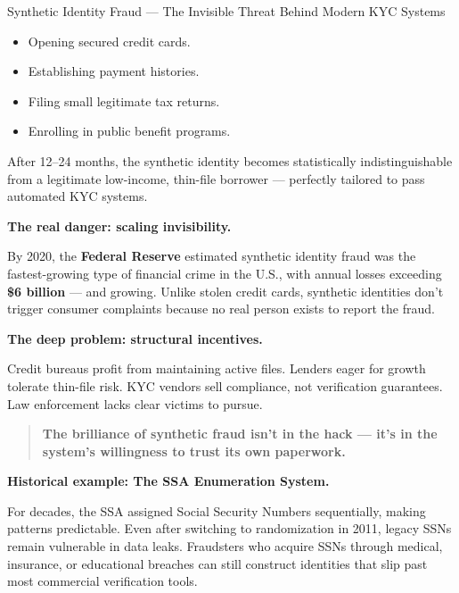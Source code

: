 \begin{HistoricalSidebar}{Synthetic Identity Fraud --- The Invisible Threat Behind Modern KYC Systems}
    \begin{itemize}
      \item Opening secured credit cards.
      \item Establishing payment histories.
      \item Filing small legitimate tax returns.
      \item Enrolling in public benefit programs.
    \end{itemize}
    
    \medskip
    
    After 12--24 months, the synthetic identity becomes statistically indistinguishable from a legitimate low-income, thin-file borrower — perfectly tailored to pass automated KYC systems.
    
    \medskip
    
    \textbf{The real danger: scaling invisibility.}
    
    By 2020, the \textbf{Federal Reserve} estimated synthetic identity fraud was the fastest-growing type of financial crime in the U.S., with annual losses exceeding \textbf{\$6 billion} — and growing. Unlike stolen credit cards, synthetic identities don't trigger consumer complaints because no real person exists to report the fraud.
    
    \medskip
    
    \textbf{The deep problem: structural incentives.}
    
    Credit bureaus profit from maintaining active files. Lenders eager for growth tolerate thin-file risk. KYC vendors sell compliance, not verification guarantees. Law enforcement lacks clear victims to pursue.
    
    \begin{quote}
    \textbf{The brilliance of synthetic fraud isn’t in the hack — it’s in the system’s willingness to trust its own paperwork.}
    \end{quote}
    
    \textbf{Historical example: The SSA Enumeration System.}
    
    For decades, the SSA assigned Social Security Numbers sequentially, making patterns predictable. Even after switching to randomization in 2011, legacy SSNs remain vulnerable in data leaks. Fraudsters who acquire SSNs through medical, insurance, or educational breaches can still construct identities that slip past most commercial verification tools.
    
    \medskip
    

\end{HistoricalSidebar}
